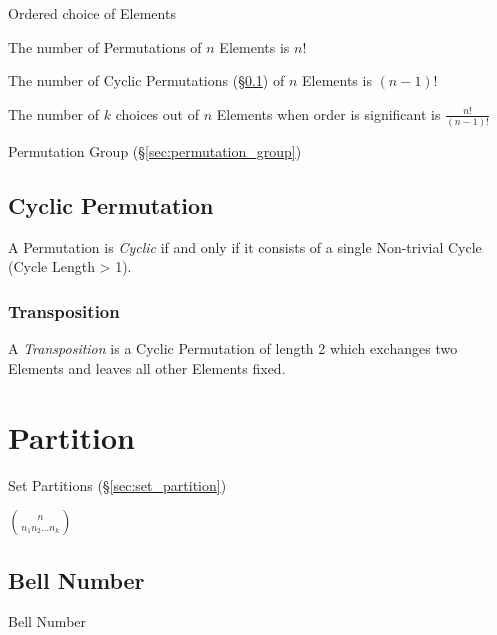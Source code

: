 Ordered choice of Elements

The number of Permutations of $n$ Elements is $n!$

The number of Cyclic Permutations (\S\ref{sec:cyclic_permutation}) of
$n$ Elements is $(n-1)!$

The number of $k$ choices out of $n$ Elements when order is
significant is $\frac{n!}{(n-1)!}$

Permutation Group (\S\ref{sec:permutation_group})



\subsection{Cyclic Permutation}\label{sec:cyclic_permutation}

A Permutation is \emph{Cyclic} if and only if it consists of a single
Non-trivial Cycle (Cycle Length > 1).



\subsubsection{Transposition}\label{sec:transposition}

A \emph{Transposition} is a Cyclic Permutation of length 2 which
exchanges two Elements and leaves all other Elements fixed.



\section{Partition}\label{sec:partition}

Set Partitions (\S\ref{sec:set_partition})

$\binom{n}{n_1 n_2 \ldots n_k}$



\subsection{Bell Number}\label{sec:bell_number}

Bell Number

